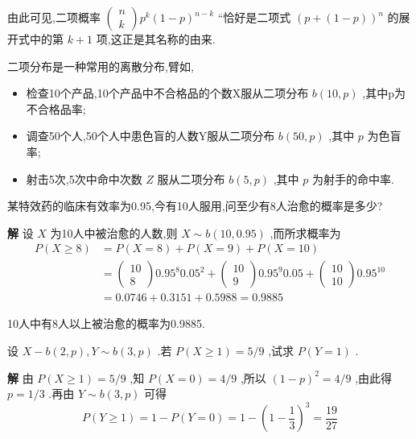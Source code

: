 由此可见,二项概率 $ \left( \begin{array}{l}{n} \\ {k}\end{array}\right) p^{k}(1-p)^{n-k} $ ``恰好是二项式 $ (p+(1-p))^{n} $ 的展开式中的第 $ k+1 $ 项,这正是其名称的由来.

二项分布是一种常用的离散分布,臂如,

\begin{itemize}
	\item 检查10个产品,10个产品中不合格品的个数X服从二项分布 $ b(10,p) $ ,其中p为不合格品率;
	\item 调查50个人,50个人中患色盲的人数Y服从二项分布 $ b(50,p) $ ,其中 $ p $ 为色盲率;
	\item 射击5次,5次中命中次数 $ Z $ 服从二项分布 $ b(5,p) $ ,其中 $ p $ 为射手的命中率.
\end{itemize}

\begin{example}\label{exam:2.4.1}
	某特效药的临床有效率为0.95,今有10人服用,问至少有8人治愈的概率是多少?
	
	\textbf{解} 设 $ X $ 为10人中被治愈的人数,则 $ X \sim b(10,0.95) $ ,而所求概率为
	\[
	\begin{aligned} P(X \geqslant 8) &=P(X=8)+P(X=9)+P(X=10) \\ &=\left( \begin{array}{c}{10} \\ {8}\end{array}\right) 0.95^{8} 0.05^{2}+\left( \begin{array}{c}{10} \\ {9}\end{array}\right) 0.95^{9} 0.05+\left( \begin{array}{c}{10} \\ {10}\end{array}\right) 0.95^{10} \\ &=0.0746+0.3151+0.5988=0.9885 \end{aligned}
	\]
	
	10人中有8人以上被治愈的概率为0.9885.
	
\end{example}

\begin{example}\label{exam:2.4.2}
	设 $ X-b(2, p), Y \sim b(3, p) $ .若 $ P(X \geqslant 1)=5 / 9 $ ,试求 $ P(Y=1) $ .
	
	\textbf{解} 由 $ P(X \geqslant 1)=5 / 9 $ ,知 $ P(X=0)=4/9 $ ,所以 $ (1-p)^{2}=4/9 $ ,由此得 $ p=1/3 $ .再由 $ Y \sim b(3, p) $ 可得
	\[
	P(Y \geqslant 1)=1-P(Y=0)=1-\left(1-\frac{1}{3}\right)^{3}=\frac{19}{27}
	\]
	
\end{example}

